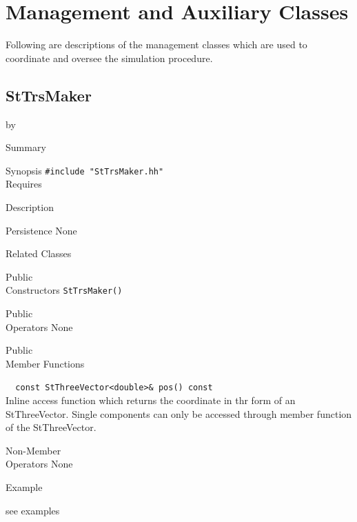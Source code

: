 \documentclass[twoside]{article}
\newcommand{\entrylabel}[1]{\mbox{\textbf{{#1}}}\hfil}%
\newenvironment{entry}
{\begin{list}{}%
    {\renewcommand{\makelabel}{\entrylabel}%
     \setlength{\labelwidth}{90pt}%
     \setlength{\leftmargin}{\labelwidth}
     \advance\leftmargin by \labelsep%
      }%
    }%
  {\end{list}}
\newcommand{\Entrylabel}[1]%
{\raisebox{0pt}[1ex][0pt]{\makebox[\labelwidth][l]%
    {\parbox[t]{\labelwidth}{\hspace{0pt}\textbf{{#1}}}}}}
\newenvironment{Entry}%
{\renewcommand{\entrylabel}{\Entrylabel}\begin{entry}}%
  {\end{entry}}
\begin{document}
\section{Management and Auxiliary Classes}
\label{sec:auxillary}

Following are descriptions of the management classes which
are used to coordinate and oversee the simulation procedure.

%
%
\subsection{StTrsMaker} 
\label{sec:stTrsMaker}

\begin{Entry}
\item[Summary]


\item[Synopsis]
  \verb+#include "StTrsMaker.hh"+\\
  Requires 

\item[Description]

\item[Persistence]
   None

\item[Related Classes]


\item[Public \\ Constructors]
   \verb+StTrsMaker()+\\


\item[Public \\ Operators]
   None

\item[Public \\ Member Functions]

  \verb+  const StThreeVector<double>& pos() const+\\
  Inline access function which returns the coordinate in thr
  form of an StThreeVector.  Single components can only be accessed
  through member function of the StThreeVector. 

\item[Non-Member \\ Operators]
  None

\item[Example]

see examples


\end{Entry}
\clearpage
\end{document}
